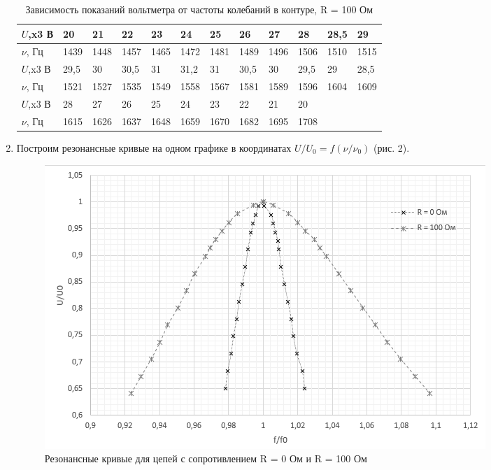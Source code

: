 \documentclass[a4paper]{article}
\begin{document}
\begin{enumerate}
        \begin{table}[h]
    \centering
    \begin{center}
    \caption{Зависимость показаний вольтметра от частоты колебаний в контуре, R = 100 Ом}
    \end{center}
    \vspace{0.1cm}
    \label{tab:my_label}
    \begin{tabular}{ |p{1.5cm}||p{0.7cm}|p{0.7cm}|p{0.7cm}|p{0.7cm}|p{0.7cm}|p{0.7cm}|p{0.7cm}|p{0.7cm}|p{0.7cm}|p{0.7cm}|p{0.7cm}|  }
 \hline
 $U$,x3 В  & 20 & 21 & 22 & 23 & 24 & 25 & 26 & 27 & 28 & 28,5 & 29   \\
\hline 
 $\nu$, Гц & 1439 & 1448 & 1457 & 1465 & 1472 & 1481 & 1489 & 1496 & 1506 & 1510 & 1515 \\
 \hline
 \hline
 
  $U$,x3 В  & 29,5 & 30 & 30,5 & 31 & 31,2 & 31 & 30,5 & 30 & 29,5 & 29 & 28,5   \\
\hline 
 $\nu$, Гц & 1521 & 1527 & 1535 & 1549 & 1558 & 1567 & 1581 & 1589 & 1596 & 1604 & 1609 \\
 \hline
 \hline
 
  $U$,x3 В  & 28 & 27 & 26 & 25 & 24 & 23 & 22 & 21 & 20   \\
\hline 
 $\nu$, Гц & 1615 & 1626 & 1637 & 1648 & 1659 & 1670 & 1682 & 1695 & 1708  \\
 \hline

\end{tabular}
\end{table}
    
    \item Построим резонансные кривые на одном графике в координатах $U/U_0 = f(\nu/\nu_0)$ (рис. 2).
    
\begin{figure}[h]
    \centering
    \includegraphics[width=\textwidth]{graph1.PNG}
    \caption{Резонансные кривые для цепей с сопротивлением R = 0 Ом и R = 100 Ом}
    \label{fig:vac}
\end{figure}


\end{enumerate}
\end{document}
